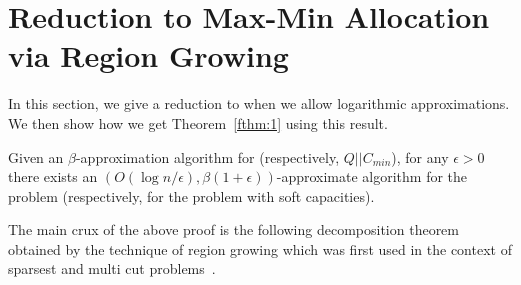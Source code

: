 \section{Reduction to Max-Min Allocation via Region Growing}\label{fsec:regiongrowing}
In this section, we give a reduction to \cckp  when we allow logarithmic approximations. We then show how we get Theorem~\ref{fthm:1} using this result.
\begin{theorem}\label{fthm:weakred}
	Given an $\beta$-approximation algorithm for \cckp (respectively, $Q||C_{min}$), for any $\epsilon>0$ there exists an $\left(O(\log n/\epsilon), \beta(1+\epsilon)\right)$-approximate algorithm for the \mckc problem (respectively, for the \mckc problem with soft capacities).
\end{theorem}

The main crux of the above proof is the following decomposition theorem obtained by the technique of region growing which was first used in the context of sparsest and multi cut problems~\cite{LeightonR99,GargVY96}.


